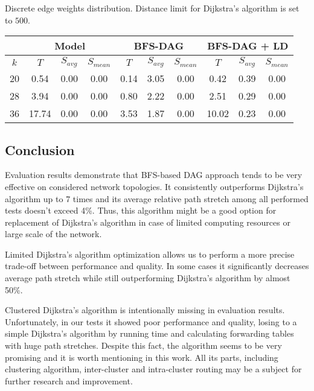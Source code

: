 \bigskip

Discrete edge weights distribution. Distance limit for Dijkstra's algorithm is set to $500$.

\smallskip

\bgroup
\def\arraystretch{1.5}
\begin{tabular}{ |c|c|c|c|c|c|c|c|c|c| } 

\hline
& \multicolumn{3}{|c|}{Model}
& \multicolumn{3}{|c|}{BFS-DAG}
& \multicolumn{3}{|c|}{BFS-DAG + LD} \\

\hline
$k$
& $T$ & $S_{avg}$ & $S_{mean}$
& $T$ & $S_{avg}$ & $S_{mean}$
& $T$ & $S_{avg}$ & $S_{mean}$ \\

\hline
20
& 0.54 & 0.00 & 0.00
& 0.14 & 3.05 & 0.00
& 0.42 & 0.39 & 0.00 \\

\hline
28
& 3.94 & 0.00 & 0.00
& 0.80 & 2.22 & 0.00
& 2.51 & 0.29 & 0.00 \\

\hline
36
& 17.74 & 0.00 & 0.00
& 3.53 & 1.87 & 0.00
& 10.02 & 0.23 & 0.00 \\

\hline
\end{tabular}
\egroup

\subsection{Conclusion}

Evaluation results demonstrate that BFS-based DAG approach tends to be very effective on considered network topologies. It consistently outperforms Dijkstra's algorithm up to 7 times and its average relative path stretch among all performed tests doesn't exceed 4\%. Thus, this algorithm might be a good option for replacement of Dijkstra's algorithm in case of limited computing resources or large scale of the network.

Limited Dijkstra's algorithm optimization allows us to perform a more precise trade-off between performance and quality. In some cases it significantly decreases average path stretch while still outperforming Dijkstra's algorithm by almost 50\%.

Clustered Dijkstra's algorithm is intentionally missing in evaluation results. Unfortunately, in our tests it showed poor performance and quality, losing to a simple Dijkstra's algorithm by running time and calculating forwarding tables with huge path stretches. Despite this fact, the algorithm seems to be very promising and it is worth mentioning in this work. All its parts, including clustering algorithm, inter-cluster and intra-cluster routing may be a subject for further research and improvement.
